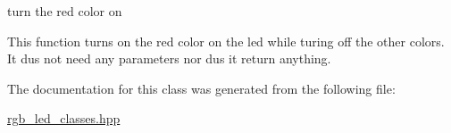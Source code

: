 turn the red color on 

This function turns on the red color on the led while turing off the other colors. It dus not need any parameters nor dus it return anything. 

The documentation for this class was generated from the following file\+:\begin{DoxyCompactItemize}
\item 
\hyperlink{rgb__led__classes_8hpp}{rgb\+\_\+led\+\_\+classes.\+hpp}\end{DoxyCompactItemize}
